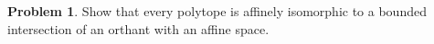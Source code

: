 \documentclass[letterpaper,11pt]{amsart}
\theoremstyle{plain}
\newtheorem{lemma}[thm]{Lemma}
\theoremstyle{definition}
\newtheorem{pr}{Problem}
\theoremstyle{remark}
\begin{document}
\begin{pr}
    Show that every polytope is affinely isomorphic to a bounded intersection of an orthant with an affine space.
\end{pr}

\end{document}
